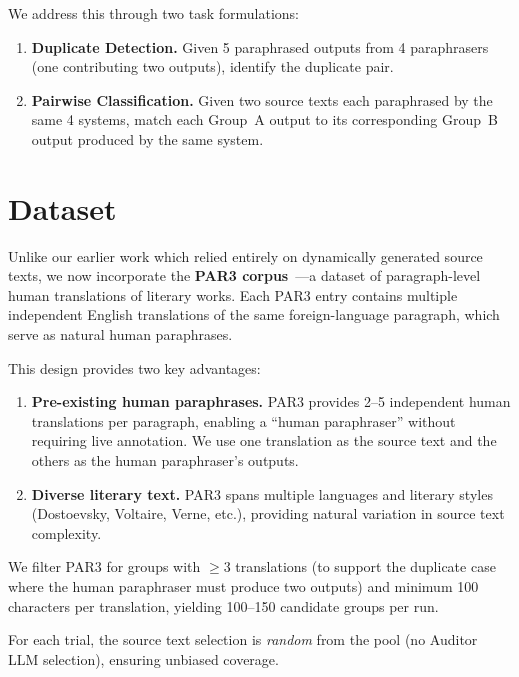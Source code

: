 \documentclass[sigconf,nonacm]{acmart}
\begin{document}
We address this through two task formulations:
\begin{enumerate}
    \item \textbf{Duplicate Detection.} Given 5 paraphrased outputs from 4 paraphrasers (one contributing two outputs), identify the duplicate pair.
    \item \textbf{Pairwise Classification.} Given two source texts each paraphrased by the same 4 systems, match each Group~A output to its corresponding Group~B output produced by the same system.
\end{enumerate}

\section{Dataset}

Unlike our earlier work which relied entirely on dynamically generated source texts, we now incorporate the \textbf{PAR3 corpus}~\cite{par3}---a dataset of paragraph-level human translations of literary works.
Each PAR3 entry contains multiple independent English translations of the same foreign-language paragraph, which serve as natural human paraphrases.

This design provides two key advantages:
\begin{enumerate}
    \item \textbf{Pre-existing human paraphrases.} PAR3 provides 2--5 independent human translations per paragraph, enabling a ``human paraphraser'' without requiring live annotation. We use one translation as the source text and the others as the human paraphraser's outputs.
    \item \textbf{Diverse literary text.} PAR3 spans multiple languages and literary styles (Dostoevsky, Voltaire, Verne, etc.), providing natural variation in source text complexity.
\end{enumerate}

We filter PAR3 for groups with $\geq 3$ translations (to support the duplicate case where the human paraphraser must produce two outputs) and minimum 100 characters per translation, yielding 100--150 candidate groups per run.

For each trial, the source text selection is \emph{random} from the pool (no Auditor LLM selection), ensuring unbiased coverage.

\end{document}
